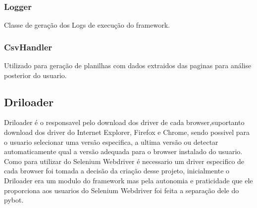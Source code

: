             \subsubsection{Logger}
            Classe de geração dos Logs de execução do framework.

            \subsubsection{CsvHandler}
            Utilizado para geração de planilhas com dados extraidos das paginas para análise posterior do usuario.

        \subsection{Driloader}
        \label{driloader}
            Driloader é o responsavel pelo download dos driver de cada browser,suportanto download dos driver do Internet Explorer,
            Firefox e Chrome, sendo possivel para o usuario selecionar uma versão especifica, a ultima versão ou detectar
            automaticamente qual a versão adequada para o browser instalado do usuario. Como para utilizar do Selenium
            Webdriver é necessario um driver especifico de cada browser foi tomada a decisão da criação desse projeto,
            inicialmente o Driloader era um modulo do framework mas pela autonomia e praticidade que ele proporciona aos
            usuarios do Selenium Webdriver foi feita a separação dele do pybot.



